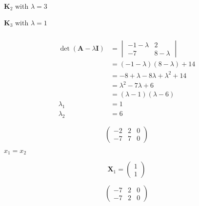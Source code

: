 \documentclass{article}
\begin{document}
\setcounter{subsubsection}{4}
\subsubsection{}

$\mathbf{K}_2$ with $\lambda = 3$

$\mathbf{K}_3$ with $\lambda = 1$

\setcounter{subsubsection}{6}
\subsubsection{}

\begin{align*}
  \det (\mathbf{A} - \lambda \mathbf{I}) & = \begin{vmatrix}
                                               -1 - \lambda & 2           \\
                                               -7           & 8 - \lambda
                                             \end{vmatrix}                \\
                                         & = (-1 - \lambda) (8 - \lambda) + 14         \\
                                         & = -8 + \lambda - 8 \lambda + \lambda^2 + 14 \\
                                         & = \lambda^2 - 7 \lambda + 6                 \\
                                         & = (\lambda - 1) (\lambda - 6)               \\
  \lambda_1                              & = 1                                         \\
  \lambda_2                              & = 6
\end{align*}

\[\left( \begin{array}{cc|c}
      -2 & 2 & 0 \\
      -7 & 7 & 0
    \end{array} \right)\]

$x_1 = x_2$

\[\mathbf{X}_1 = \begin{pmatrix}
    1 \\
    1
  \end{pmatrix}\]

\[\left( \begin{array}{cc|c}
      -7 & 2 & 0 \\
      -7 & 2 & 0
    \end{array} \right)\]
\end{document}
